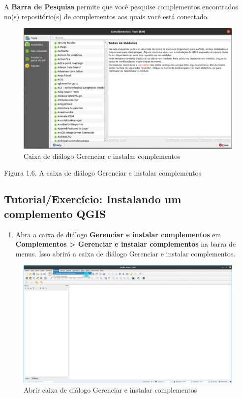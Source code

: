 \documentclass[
]{krantz}
\providecommand{\tightlist}{%
  \setlength{\itemsep}{0pt}\setlength{\parskip}{0pt}}
\begin{document}
A \textbf{Barra de Pesquisa} permite que você pesquise complementos encontrados no(s) repositório(s) de complementos aos quais você está conectado.

\begin{figure}
\centering
\includegraphics{media/modulo1/manage-and-install-plugins-dialog.png}
\caption{Caixa de diálogo Gerenciar e instalar complementos}
\end{figure}

Figura 1.6. A caixa de diálogo Gerenciar e instalar complementos

\hypertarget{tutorialexercuxedcio-instalando-um-complemento-qgis}{%
\subsection{Tutorial/Exercício: Instalando um complemento QGIS}\label{tutorialexercuxedcio-instalando-um-complemento-qgis}}

\begin{enumerate}
\def\labelenumi{\arabic{enumi}.}
\tightlist
\item
  Abra a caixa de diálogo \textbf{Gerenciar e instalar complementos} em \textbf{Complementos \textgreater{} Gerenciar e instalar complementos} na barra de menus. Isso abrirá a caixa de diálogo Gerenciar e instalar complementos.
\end{enumerate}

\begin{figure}
\centering
\includegraphics{media/modulo1/plugins-menu-2.png}
\caption{Abrir caixa de diálogo Gerenciar e instalar complementos}
\end{figure}
\end{document}
